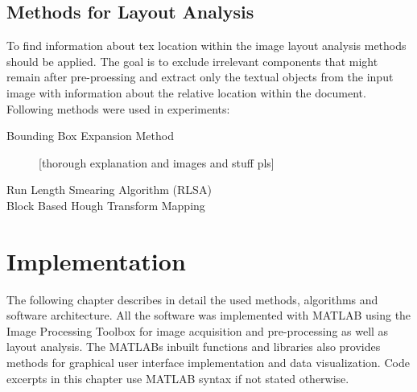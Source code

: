 \documentclass{article}
\begin{document}
    \subsection{Methods for Layout Analysis}
      To find information about tex location within the image layout analysis methods should be applied. The goal is to exclude irrelevant components that might remain after pre-proessing and extract only the textual objects from the input image with information about the relative location within the document. Following methods were used in experiments:
      \begin{description}
        \item [Bounding Box Expansion Method] [thorough explanation and images and stuff pls]
        \item [Run Length Smearing Algorithm (RLSA)]
        \item [Block Based Hough Transform Mapping]
      \end{description}

  \newpage
  \section{Implementation}
    The following chapter describes in detail the used methods, algorithms and software architecture. All the software was implemented with MATLAB using the Image Processing Toolbox for image acquisition and pre-processing as well as layout analysis.\cite{TheMathWorksa} The MATLABs inbuilt functions and libraries also provides methods for graphical user interface implementation and data visualization. Code excerpts in this chapter use MATLAB syntax if not stated otherwise.
\end{document}
